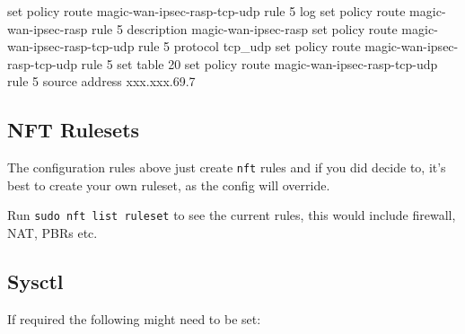 \documentclass[
]{article}
\newenvironment{Shaded}{\begin{snugshade}}{\end{snugshade}}
\newcommand{\BuiltInTok}[1]{#1}
\newcommand{\NormalTok}[1]{#1}
\newcommand{\StringTok}[1]{\textcolor[rgb]{0.31,0.60,0.02}{#1}}
\begin{document}
\begin{Shaded}
\begin{Highlighting}[numbers=left,,]
\BuiltInTok{set}\NormalTok{ policy route magic{-}wan{-}ipsec{-}rasp{-}tcp{-}udp rule 5 log}
\BuiltInTok{set}\NormalTok{ policy route magic{-}wan{-}ipsec{-}rasp rule 5 description }\StringTok{\textquotesingle{}magic{-}wan{-}ipsec{-}rasp\textquotesingle{}}
\BuiltInTok{set}\NormalTok{ policy route magic{-}wan{-}ipsec{-}rasp{-}tcp{-}udp rule 5 protocol }\StringTok{\textquotesingle{}tcp\_udp\textquotesingle{}}
\BuiltInTok{set}\NormalTok{ policy route magic{-}wan{-}ipsec{-}rasp{-}tcp{-}udp rule 5 set table }\StringTok{\textquotesingle{}20\textquotesingle{}}
\BuiltInTok{set}\NormalTok{ policy route magic{-}wan{-}ipsec{-}rasp{-}tcp{-}udp rule 5 source address }\StringTok{\textquotesingle{}xxx.xxx.69.7\textquotesingle{}}
\end{Highlighting}
\end{Shaded}

\subsection{NFT Rulesets}\label{nft-rulesets}

The configuration rules above just create \texttt{nft} rules and if you
did decide to, it's best to create your own ruleset, as the config will
override.

Run \texttt{sudo\ nft\ list\ ruleset} to see the current rules, this
would include firewall, NAT, PBRs etc.

\newpage{}

\subsection{Sysctl}\label{sysctl}

If required the following might need to be set:
\end{document}
